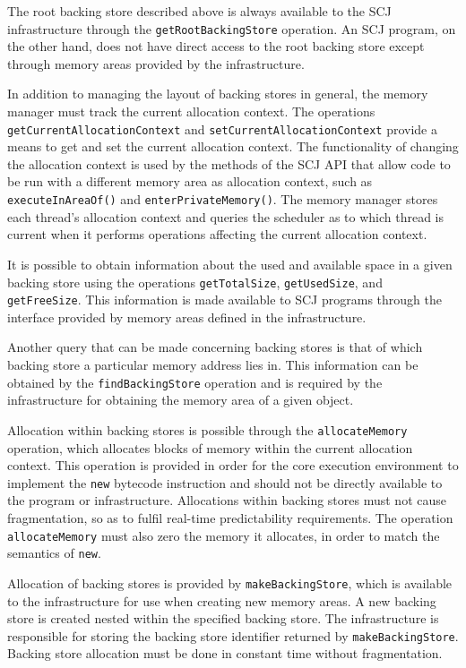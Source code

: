 \documentclass[a4paper,10pt]{report}
\begin{document}
The root backing store described above is always available to the SCJ
infrastructure through the \texttt{get\-Root\-Backing\-Store}
operation.
An SCJ program, on the other hand, does not have direct access to the
root backing store except through memory areas provided by the
infrastructure.

In addition to managing the layout of backing stores in general, the
memory manager must track the current allocation context.
The operations \texttt{get\-Cur\-rent\-Allo\-cation\-Con\-text} and
\texttt{set\-Cur\-rent\-Allo\-cation\-Con\-text} provide a means to
get and set the current allocation context.
The functionality of changing the allocation context is used by the
methods of the SCJ API that allow code to be run with a different
memory area as allocation context, such as
\texttt{execute\-In\-Area\-Of()} and
\texttt{enter\-Private\-Memory()}.
The memory manager stores each thread's allocation context and queries
the scheduler as to which thread is current when it performs
operations affecting the current allocation context.

It is possible to obtain information about the used and available
space in a given backing store using the operations
\texttt{get\-Total\-Size}, \texttt{get\-Used\-Size}, and
\texttt{get\-Free\-Size}.
This information is made available to SCJ programs through the
interface provided by memory areas defined in the infrastructure.

Another query that can be made concerning backing stores is that of
which backing store a particular memory address lies in.
This information can be obtained by the \texttt{find\-Backing\-Store}
operation and is required by the infrastructure for obtaining the
memory area of a given object.

Allocation within backing stores is possible through the
\texttt{allo\-cate\-Memory} operation, which allocates blocks of
memory within the current allocation context.
This operation is provided in order for the core execution environment
to implement the \texttt{new} bytecode instruction and should not be
directly available to the program or infrastructure.
Allocations within backing stores must not cause fragmentation, so as
to fulfil real-time predictability requirements.
The operation \texttt{allo\-cate\-Memory} must also zero the memory it
allocates, in order to match the semantics of \texttt{new}.
 
Allocation of backing stores is provided by
\texttt{make\-Back\-ing\-Store}, which is available to the
infrastructure for use when creating new memory areas.
A new backing store is created nested within the specified backing
store.
The infrastructure is responsible for storing the backing store
identifier returned by \texttt{make\-Back\-ing\-Store}.
Backing store allocation must be done in constant time without
fragmentation.
\end{document}
